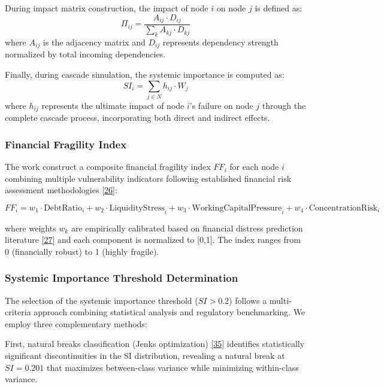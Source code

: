 \documentclass[a4 paper, 11pt,twoside]{article}
\newcommand{\0}{\Bf{0}}
\theoremstyle{definition}
\begin{document}
During impact matrix construction, the impact of node $i$ on node $j$ is defined as:
\begin{equation}
\Pi_{ij} = \frac{A_{ij} \cdot D_{ij}}{\sum_{k} A_{kj} \cdot D_{kj}}
\end{equation}
where $A_{ij}$ is the adjacency matrix and $D_{ij}$ represents dependency strength normalized by total incoming dependencies.

Finally, during cascade simulation, the systemic importance is computed as:
\begin{equation}
SI_i = \sum_{j \in N} h_{ij} \cdot W_j
\end{equation}
where $h_{ij}$ represents the ultimate impact of node $i$'s failure on node $j$ through the complete cascade process, incorporating both direct and indirect effects.

\subsubsection{Financial Fragility Index}

The work construct a composite financial fragility index $FF_i$ for each node $i$ combining multiple vulnerability indicators following established financial risk assessment methodologies \hyperref[ref26]{[26]}:

\begin{equation}
FF_i = w_1 \cdot \text{DebtRatio}_i + w_2 \cdot \text{LiquidityStress}_i + w_3 \cdot \text{WorkingCapitalPressure}_i + w_4 \cdot \text{ConcentrationRisk}_i
\end{equation}

where weights $w_k$ are empirically calibrated based on financial distress prediction literature \hyperref[ref27]{[27]} and each component is normalized to [0,1]. The index ranges from 0 (financially robust) to 1 (highly fragile).

\subsubsection{Systemic Importance Threshold Determination}

The selection of the systemic importance threshold ($SI > 0.2$) follows a multi-criteria approach combining statistical analysis and regulatory benchmarking. We employ three complementary methods:

First, natural breaks classification (Jenks optimization) \hyperref[ref35]{[35]} identifies statistically significant discontinuities in the SI distribution, revealing a natural break at $SI = 0.201$ that maximizes between-class variance while minimizing within-class variance.
\end{document}
